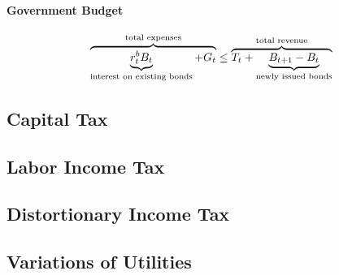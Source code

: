 \documentclass[11pt]{article}
\begin{document}
				\paragraph{Government Budget}
					\begin{equation}
						\overbrace{\underbrace{r^b_t B_t}_{\text{{interest on existing bonds}}} + G_t}^{\text{{total expenses}}} \leq \overbrace{T_t + \underbrace{B_{t+1} - B_t}_{\text{{newly issued bonds}}}}^{\text{{total revenue}}}
					\end{equation}
		
		\setcounter{equation}{0}
		\subsection{Capital Tax}
		
		
		
		\setcounter{equation}{0}
		\subsection{Labor Income Tax}
		
		
		\setcounter{equation}{0}
		\subsection{Distortionary Income Tax}
		
		\setcounter{equation}{0}
		\subsection{Variations of Utilities}
\end{document}
